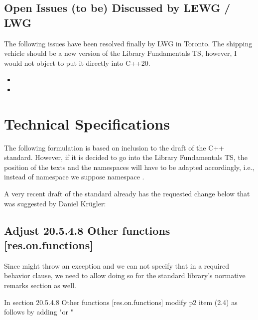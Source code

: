 \documentclass[ebook,11pt,article]{memoir}
\begin{document}
\section{Open Issues (to be) Discussed by LEWG / LWG}
The following issues have been resolved finally by LWG in Toronto. The shipping vehicle should be a new version of the Library Fundamentals TS, however, I would not object to put it directly into C++20.
\begin{itemize}
\item {}
\item {}
\end{itemize}

\newpage
\chapter{Technical Specifications}
The following formulation is based on inclusion to the draft of the C++ standard. However, if it is decided to go into the Library Fundamentals TS, the position of the texts and the namespaces will have to be adapted accordingly, i.e., instead of namespace  we suppose namespace . 

A very recent draft of the standard already has the requested change below that was suggested by Daniel Kr\"ugler:

\section{Adjust 20.5.4.8 Other functions [res.on.functions]}
Since  might throw an exception and we can not specify that in a required behavior clause, we need to allow doing so for the standard library's normative remarks section as well.

In section 20.5.4.8 Other functions [res.on.functions] modify p2 item (2.4) as follows by adding "or \remarks"
\end{document}
